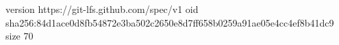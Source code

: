 version https://git-lfs.github.com/spec/v1
oid sha256:84d1ace0d8fb54872e3ba502c2650e8d7ff658b0259a91ae05e4cc4ef8b41dc9
size 70
